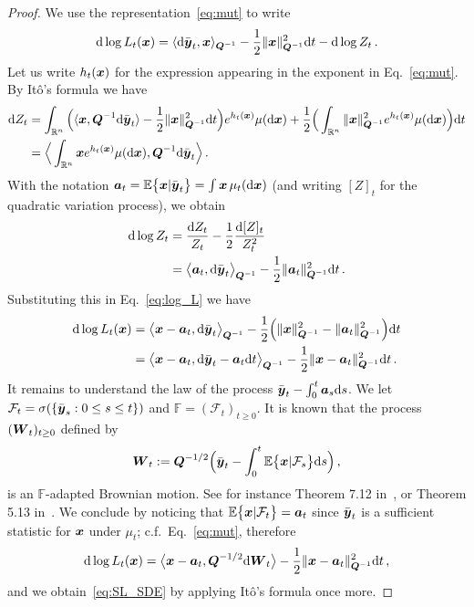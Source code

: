\documentclass[11pt]{article}
\numberwithin{equation}{section}
\theoremstyle{myremark}
\theoremstyle{myremark}
\theoremstyle{myexample}
\newcommand{\R}{\mathbb{R}}
\newcommand{\mF}{\mathcal{F}}
\newcommand{\1}{\mathbf{1}}
\begin{document}
\begin{proof}  
We use the representation~\eqref{eq:mut} to write
\begin{align}\label{eq:log_L}
{\rm d} \log L_t({\boldsymbol{x}}) = \langle {\rm d} \bar{{\boldsymbol{y}}}_t ,  {\boldsymbol{x}}\rangle_{{\boldsymbol{Q}}^{-1}} - \frac{1}{2} \|{\boldsymbol{x}}\|_{{\boldsymbol{Q}}^{-1}}^2 {\rm d} t - {\rm d} \log Z_t\, .
\end{align}
Let us write $h_t({\boldsymbol{x}})$ for the expression appearing in the exponent in Eq.~\eqref{eq:mut}. By It\^{o}'s formula we have
\begin{align}
\de Z_t &= \int_{\R^n} \Big(\< \bx , \bQ^{-1} \de \bar{\by}_t \>- \frac{1}{2}\|\bx\|_{\bQ^{-1}}^2 
\de t \Big)  e^{h_t(\bx)} \mu(\de\bx)
 + \frac{1}{2}  \Big(\int_{\R^n} \|\bx\|_{\bQ^{-1}}^2  e^{h_t(\bx)} \mu(\de\bx) \Big) \de t \\
&=  \Big\langle \int_{\R^n} \bx e^{h_t(\bx)} \mu(\de \bx) , \bQ^{-1} \de \bar{\by}_t \Big\rangle \, . 
\end{align}
With the notation $ {\boldsymbol{a}}_t ={\mathbb E}\big\{{\boldsymbol{x}} | \bar{{\boldsymbol{y}}}_t\big\} = \int {\boldsymbol{x}}  \, \mu_t({\rm d}{\boldsymbol{x}})$ 
(and writing $[Z]_t$ for the quadratic variation process), we obtain
\begin{align}
{\rm d} \log Z_t &= \frac{{\rm d} Z_t}{Z_t} - \frac{1}{2} \frac{{\rm d} [Z]_t}{Z_t^2} \\
&= \big\langle {\boldsymbol{a}}_t ,  {\rm d} \bar{{\boldsymbol{y}}}_t \big\rangle_{{\boldsymbol{Q}}^{-1}} - \frac{1}{2} \| {\boldsymbol{a}}_t \|_{{\boldsymbol{Q}}^{-1}}^2 {\rm d} t \, .
\end{align}
Substituting this in Eq.~\eqref{eq:log_L} we have
\begin{align}
{\rm d} \log L_t({\boldsymbol{x}}) &= \big\langle {\boldsymbol{x}} - {\boldsymbol{a}}_t ,  {\rm d} \bar{{\boldsymbol{y}}}_t \big\rangle_{{\boldsymbol{Q}}^{-1}} - \frac{1}{2} \Big(\|{\boldsymbol{x}}\|_{{\boldsymbol{Q}}^{-1}}^2 - \| {\boldsymbol{a}}_t \|_{{\boldsymbol{Q}}^{-1}}^2\Big){\rm d} t \\
&= \big\langle {\boldsymbol{x}} - {\boldsymbol{a}}_t ,  {\rm d} \bar{{\boldsymbol{y}}}_t -{\boldsymbol{a}}_t {\rm d} t \big\rangle_{{\boldsymbol{Q}}^{-1}} - \frac{1}{2} \|{\boldsymbol{x}} - {\boldsymbol{a}}_t\|_{{\boldsymbol{Q}}^{-1}}^2 {\rm d} t \, .
\end{align}
It remains to understand the law of the process $\bar{{\boldsymbol{y}}}_t - \int_0^t {\boldsymbol{a}}_s {\rm d} s$. 
We let $\mF_t = \sigma(\{\bar{\by}_s: 0 \le s \le t\})$ and $\mathbb{F} = (\mF_t)_{ t \ge 0}$. 
It is known  that the process $(\boldsymbol{W}_t)_{t \ge 0}$ defined by
\begin{equation}
\bW_t := \bQ^{-1/2}\Big(\bar{\by}_t - \int_0^t \E\big\{ \bx | \mF_s \big\} \de s \Big)\, ,
\end{equation}
is an $\mathbb{F}$-adapted Brownian motion. 
See for instance Theorem 7.12 in~\cite{liptser1977statistics}, 
or Theorem 5.13 in~\cite{le2016brownian}. 
We conclude by noticing that $\E\big\{ \bx | \mF_t \big\} = \ba_t$ since $\bar{{\boldsymbol{y}}}_t$ is a sufficient statistic for ${\boldsymbol{x}}$ under $\mu_t$; c.f.\ Eq.~\eqref{eq:mut}, therefore    
\begin{equation}
{\rm d} \log L_t({\boldsymbol{x}}) = \big\langle {\boldsymbol{x}} - {\boldsymbol{a}}_t ,  {\boldsymbol{Q}}^{-1/2}{\rm d} \boldsymbol{W}_t \big\rangle - \frac{1}{2} \|{\boldsymbol{x}} - {\boldsymbol{a}}_t\|_{{\boldsymbol{Q}}^{-1}}^2 {\rm d} t \, , 
 \end{equation}
and we obtain~\eqref{eq:SL_SDE} by applying It\^{o}'s formula once more. 
\end{proof}
\end{document}
